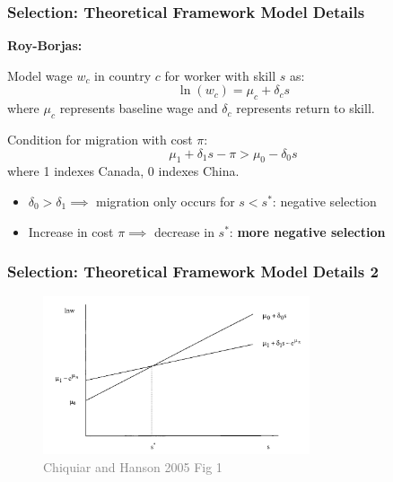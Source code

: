 \documentclass[xcolor=dvipsnames, compress, 12pt, aspectratio=169, handout]{beamer}
\begin{document}
\begin{frame}
    \label{theory1}
    \frametitle{Selection: Theoretical Framework Model Details \hyperlink{theory_main}{}}
    \textbf{Roy-Borjas:} \vspace{1mm}

    Model wage $w_c$ in country $c$ for worker with skill $s$ as: 
    \begin{equation}
        \ln(w_c) = \mu_c + \delta_c s 
    \end{equation}
    where $\mu_c$ represents baseline wage and $\delta_c$ represents return to skill.
    \vspace{1mm}

    Condition for migration with cost $\pi$:
    \begin{equation}
        \mu_1 + \delta_1 s - \pi > \mu_0 - \delta_0s
    \end{equation}
    where 1 indexes Canada, 0 indexes China.
    \vspace{1mm}
    \begin{itemize}
        \item $\delta_0 > \delta_1 \implies$ migration only occurs for $s < s^*$: negative selection
        \vspace{1mm}
        \item Increase in cost $\pi \implies $ decrease in $s^*$: \textbf{more negative selection}
    \end{itemize}
\end{frame}

\begin{frame}
    \label{theory2}
    \frametitle{Selection: Theoretical Framework Model Details 2 \hyperlink{theory_main}{}}
    \begin{figure}
        \includegraphics[width = 0.7\textwidth]{../../figs/slides/royborjas.png}
        \caption{\textcolor{gray}{Chiquiar and Hanson 2005 Fig 1}}
    \end{figure}
\end{frame}
\end{document}
